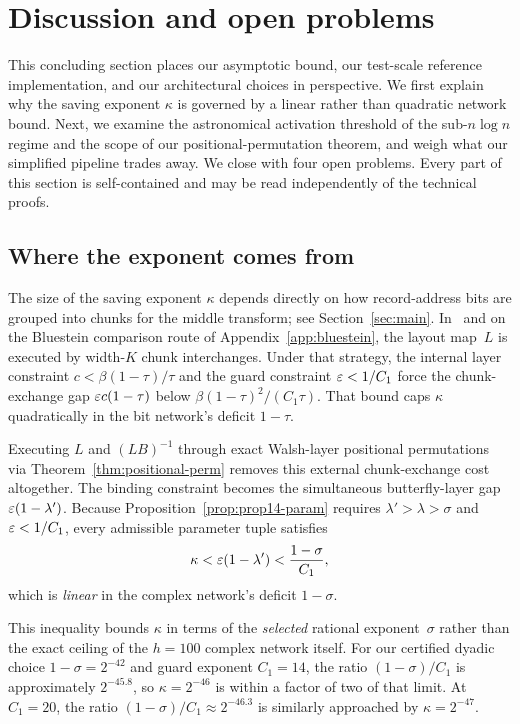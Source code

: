 \section{Discussion and open problems}\label{sec:discussion}

This concluding section places our asymptotic bound, our test-scale reference implementation, and our architectural choices in perspective. We first explain why the saving exponent $\kappa$ is governed by a linear rather than quadratic network bound. Next, we examine the astronomical activation threshold of the sub-$n\log n$ regime and the scope of our positional-permutation theorem, and weigh what our simplified pipeline trades away. We close with four open problems. Every part of this section is self-contained and may be read independently of the technical proofs.

\subsection{Where the exponent comes from}\label{sec:disc-kappa}

The size of the saving exponent $\kappa$ depends directly on how record-address bits are grouped into chunks for the middle transform; see Section~\ref{sec:main}. In~\cite{OAI26} and on the Bluestein comparison route of Appendix~\ref{app:bluestein}, the layout map~$L$ is executed by width-$K$ chunk interchanges. Under that strategy, the internal layer constraint $c<\beta(1-\tau)/\tau$ and the guard constraint $\varepsilon<1/C_1$ force the chunk-exchange gap $\varepsilon c(1-\tau)$ below $\beta(1-\tau)^2/(C_1\tau)$. That bound caps $\kappa$ quadratically in the bit network's deficit $1-\tau$.

Executing $L$ and $(LB)^{-1}$ through exact Walsh-layer positional permutations via Theorem~\ref{thm:positional-perm} removes this external chunk-exchange cost altogether. The binding constraint becomes the simultaneous butterfly-layer gap $\varepsilon(1-\lambda')$. Because Proposition~\ref{prop:prop14-param} requires $\lambda'>\lambda>\sigma$ and $\varepsilon<1/C_1$, every admissible parameter tuple satisfies
\[
  \kappa < \varepsilon(1-\lambda') < \frac{1-\sigma}{C_1},
\]
which is \emph{linear} in the complex network's deficit $1-\sigma$.

This inequality bounds $\kappa$ in terms of the \emph{selected} rational exponent~$\sigma$ rather than the exact ceiling of the $h=100$ complex network itself. For our certified dyadic choice $1-\sigma=2^{-42}$ and guard exponent $C_1=14$, the ratio $(1-\sigma)/C_1$ is approximately $2^{-45.8}$, so $\kappa=2^{-46}$ is within a factor of two of that limit. At $C_1=20$, the ratio $(1-\sigma)/C_1\approx 2^{-46.3}$ is similarly approached by $\kappa=2^{-47}$.

